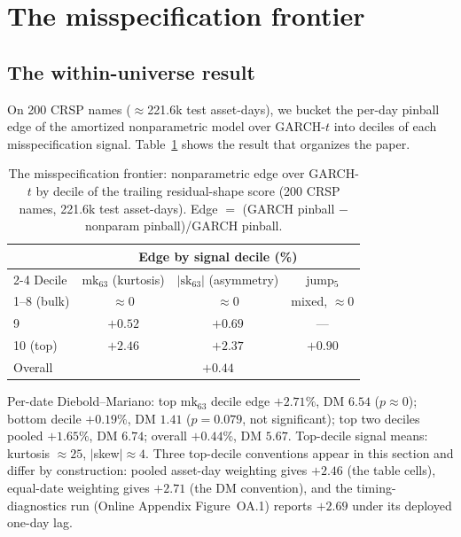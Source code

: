 \documentclass[11pt]{article}
\theoremstyle{remark}
\begin{document}
\section{The misspecification frontier}\label{sec:frontier}

\subsection{The within-universe result}

On 200 CRSP names ($\approx$221.6k test asset-days), we bucket the per-day
pinball edge of the amortized nonparametric model over GARCH-$t$ into
deciles of each misspecification signal.
Table~\ref{tab:frontier} shows the result that organizes the paper.

\begin{table}[t]
\centering
\begin{threeparttable}
\caption{The misspecification frontier: nonparametric edge over
GARCH-$t$ by decile of the trailing residual-shape score (200 CRSP
names, 221.6k test asset-days). Edge $=$ (GARCH pinball $-$ nonparam
pinball)/GARCH pinball.}
\label{tab:frontier}
\begin{tabular}{lccc}
\toprule
& \multicolumn{3}{c}{Edge by signal decile (\%)} \\
\cmidrule(lr){2-4}
Decile & $\mathrm{mk}_{63}$ (kurtosis) & $|\mathrm{sk}_{63}|$ (asymmetry) & jump$_5$ \\
\midrule
1--8 (bulk) & $\approx 0$ & $\approx 0$ & mixed, $\approx 0$ \\
9 & $+0.52$ & $+0.69$ & --- \\
10 (top) & $\mathbf{+2.46}$ & $\mathbf{+2.37}$ & $+0.90$ \\
\midrule
Overall & \multicolumn{3}{c}{$+0.44$} \\
\bottomrule
\end{tabular}
\begin{tablenotes}\footnotesize
\item Per-date Diebold--Mariano: top $\mathrm{mk}_{63}$ decile edge
$+2.71\%$, DM $6.54$ ($p \approx 0$); bottom decile $+0.19\%$, DM $1.41$
($p = 0.079$, not significant); top two deciles pooled $+1.65\%$, DM
$6.74$; overall $+0.44\%$, DM $5.67$. Top-decile signal means: kurtosis
$\approx 25$, $|$skew$| \approx 4$. Three top-decile conventions
appear in this section and differ by construction: pooled asset-day
weighting gives $+2.46$ (the table cells), equal-date weighting gives
$+2.71$ (the DM convention), and the timing-diagnostics run
(Online Appendix Figure~OA.1) reports $+2.69$ under its deployed
one-day lag.
\end{tablenotes}
\end{threeparttable}
\end{table}
\end{document}
